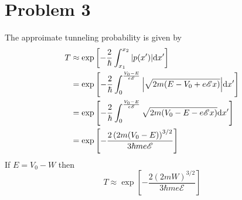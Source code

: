 \documentclass[12pt]{article}
\newcommand{\cint}[2]{\int_{#1}^{#2}}
\begin{document}
\section*{Problem 3}
The approimate tunneling probability is given by
\begin{align*}
    T & \approx \exp\left[-\frac{2}{\hbar}\cint{x_1}{x_2}\abs{p(x')}\dd x'\right] \\
    & = \exp\left[-\frac{2}{\hbar}\cint{0}{\frac{V_0-E}{e\mathscr{E}}} \abs{\sqrt{2m(E - V_0 + e\mathscr{E}x)}} \dd x' \right] \\
    & = \exp\left[-\frac{2}{\hbar}\cint{0}{\frac{V_0-E}{e\mathscr{E}}} \sqrt{2m(V_0 - E - e\mathscr{E}x)} \dd x' \right] \\
    & = \exp\left[-\frac{2\left(2m(V_0-E)\right)^{3/2}}{3\hbar me\mathscr{E}}\right]
\end{align*}
If $E = V_0 - W$ then
\[ T \approx \exp\left[-\frac{2(2mW)^{3/2}}{3\hbar me\mathscr{E}}\right] \]
\end{document}
